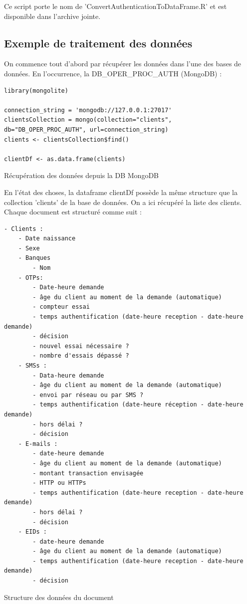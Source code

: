 Ce script porte le nom de 'ConvertAuthenticationToDataFrame.R' et est disponible dans l'archive jointe.

\subsection{Exemple de traitement des données}

On commence tout d'abord par récupérer les données dans l'une des bases de données. En l'occurrence, la DB\_OPER\_PROC\_AUTH (MongoDB) :

\begin{listing}[H]
    \begin{verbatim}
library(mongolite)

connection_string = 'mongodb://127.0.0.1:27017'
clientsCollection = mongo(collection="clients", db="DB_OPER_PROC_AUTH", url=connection_string)
clients <- clientsCollection$find()

clientDf <- as.data.frame(clients)
    \end{verbatim}
    \caption{Récupération des données depuis la DB MongoDB}
    \label{listing:thibault-retrieve-data}
\end{listing}

En l'état des choses, la dataframe clientDf possède la même structure que la collection 'clients' de la
base de données. On a ici récupéré la liste des clients. Chaque document est structuré comme suit :

\begin{listing}[H]
    \begin{verbatim}
- Clients :
    - Date naissance
    - Sexe
    - Banques
        - Nom
    - OTPs:
        - Date-heure demande
        - âge du client au moment de la demande (automatique)
        - compteur essai
        - temps authentification (date-heure reception - date-heure demande)
        - décision
        - nouvel essai nécessaire ?
        - nombre d'essais dépassé ?
    - SMSs :
        - Data-heure demande
        - âge du client au moment de la demande (automatique)
        - envoi par réseau ou par SMS ?
        - temps authentification (date-heure réception - date-heure demande)
        - hors délai ?
        - décision
    - E-mails :
        - date-heure demande
        - âge du client au moment de la demande (automatique)
        - montant transaction envisagée
        - HTTP ou HTTPs
        - temps authentification (date-heure reception - date-heure demande)
        - hors délai ?
        - décision
    - EIDs :
        - date-heure demande
        - âge du client au moment de la demande (automatique)
        - temps authentification (date-heure reception - date-heure demande)
        - décision
    \end{verbatim}
    \caption{Structure des données du document}
    \label{listing:thibault-structure-db}
\end{listing}

